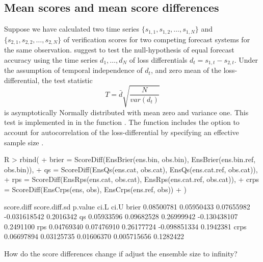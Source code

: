 \documentclass[article]{jss}
\begin{document}
\subsection{Mean scores and mean score differences}

Suppose we have calculated two time series $\{s_{1,1}, s_{1,2}, \dots, s_{1,N}\}$ and $\{s_{2,1}, s_{2,2}, \dots, s_{2,N}\}$ of verification scores for two competing forecast systems for the same observation.
\citet{diebold1995comparing} suggest to test the null-hypothesis of equal forecast accuracy using the time series $d_1, \dots, d_N$ of loss differentials $d_t = s_{1,t} - s_{2,t}$. 
Under the assumption of temporal independence of $d_t$, and zero mean of the loss-differential, the test statistic 
%
\begin{equation}
T = \bar{d}\sqrt{\frac{N}{var(d_t)}}
\end{equation}
%
is asymptotically Normally distributed with mean zero and variance one.
This test is implemented in  in the function .
The function includes the option to account for autocorrelation of the loss-differential by specifying an effective sample size .

\begin{Schunk}
\begin{Sinput}
R > rbind(
+   brier = ScoreDiff(EnsBrier(ens.bin, obs.bin), EnsBrier(ens.bin.ref, obs.bin)),
+   qs    = ScoreDiff(EnsQs(ens.cat, obs.cat),    EnsQs(ens.cat.ref, obs.cat)),
+   rps   = ScoreDiff(EnsRps(ens.cat, obs.cat),   EnsRps(ens.cat.ref, obs.cat)),
+   crps  = ScoreDiff(EnsCrps(ens, obs),          EnsCrps(ens.ref, obs))
+ )
\end{Sinput}
\begin{Soutput}
      score.diff score.diff.sd    p.value         ci.L      ci.U
brier 0.08500781    0.05950433 0.07655982 -0.031618542 0.2016342
qs    0.05933596    0.09682528 0.26999942 -0.130438107 0.2491100
rps   0.04769340    0.07476910 0.26177724 -0.098851334 0.1942381
crps  0.06697894    0.03125735 0.01606370  0.005715656 0.1282422
\end{Soutput}
\end{Schunk}


How do the score differences change if adjust the ensemble size to infinity?
\end{document}
